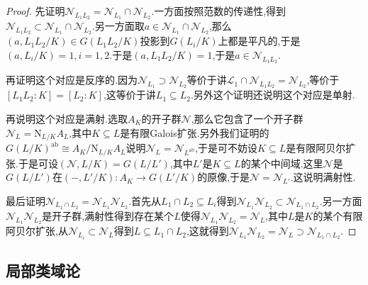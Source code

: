 \begin{enumerate}
\begin{proof}
    	先证明$\mathscr{N}_{L_1L_2}=\mathscr{N}_{L_1}\cap\mathscr{N}_{L_2}$.一方面按照范数的传递性,得到$\mathscr{N}_{L_1L_2}\subset\mathscr{N}_{L_1}\cap\mathscr{N}_{L_2}$.另一方面取$a\in\mathscr{N}_{L_1}\cap\mathscr{N}_{L_2}$,那么$(a,L_1L_2/K)\in G(L_1L_2/K)$投影到$G(L_i/K)$上都是平凡的,于是$(a,L_i/K)=1,i=1,2$.于是$(a,L_1L_2/K)=1$,于是$a\in\mathscr{N}_{L_1L_2}$.
    	
    	再证明这个对应是反序的.因为$\mathscr{N}_{L_1}\supset\mathscr{N}_{L_2}$等价于讲$\mathscr{L_1}\cap\mathscr{N}_{L_1L_2}=\mathscr{N}_{L_2}$,等价于$[L_1L_2:K]=[L_2:K]$,这等价于讲$L_1\subseteq L_2$.另外这个证明还说明这个对应是单射.
    	
    	再说明这个对应是满射.选取$A_K$的开子群$\mathscr{N}$,那么它包含了一个开子群$\mathscr{N}_L=\mathrm{N}_{L/K}A_L$,其中$K\subseteq L$是有限Galois扩张.另外我们证明的$G(L/K)^{\mathrm{ab}}\cong A_K/\mathrm{N}_{L/K}A_L$说明$\mathscr{N}_L=\mathscr{N}_{L^{\mathrm{ab}}}$,于是可不妨设$K\subseteq L$是有限阿贝尔扩张.于是可设$(\mathscr{N},L/K)=G(L/L')$,其中$L'$是$K\subseteq L$的某个中间域.这里$\mathscr{N}$是$G(L/L')$在$(-,L'/K):A_K\to G(L'/K)$的原像,于是$\mathscr{N}=\mathscr{N}_{L'}$.这说明满射性.
    	
    	最后证明$\mathscr{N}_{L_1\cap L_2}=\mathscr{N}_{L_1}\mathscr{N}_{L_2}$.首先从$L_1\cap L_2\subseteq L_i$得到$\mathscr{N}_{L_1}\mathscr{N}_{L_2}\subset\mathscr{N}_{L_1\cap L_2}$.另一方面$\mathscr{N}_{L_1}\mathscr{N}_{L_2}$是开子群,满射性得到存在某个$L$使得$\mathscr{N}_{L_1}\mathscr{N}_{L_2}=\mathscr{N}_L$,其中$L$是$K$的某个有限阿贝尔扩张,从$\mathscr{N}_{L_i}\subset\mathscr{N}_L$得到$L\subseteq L_1\cap L_2$,这就得到$\mathscr{N}_{L_1}\mathscr{N}_{L_2}=\mathscr{N}_L\supset\mathscr{N}_{L_1\cap L_2}$.
    \end{proof}
\end{enumerate}
\newpage
\subsection{局部类域论}

